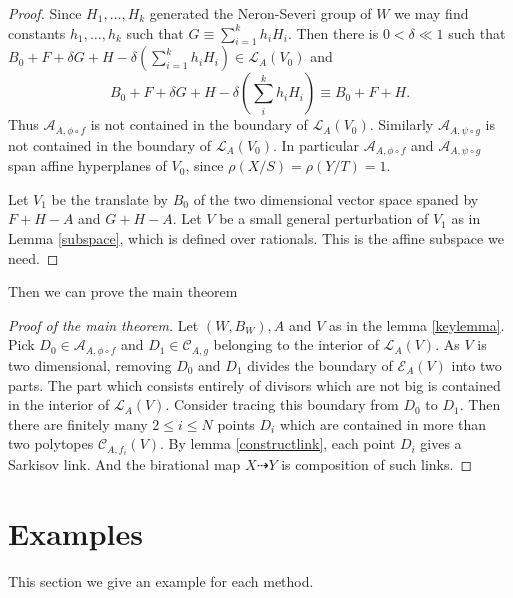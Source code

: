 \documentclass[11pt]{amsart}
\numberwithin{equation}{section}
\begin{document}
\begin{proof}
Since $H_{1},\ldots ,H_{k}$ generated the Neron-Severi group of $W$ we may find constants $h_{1},\ldots ,h_{k}$ such that $G \equiv \sum^{k}_{i=1} h_{i}H_{i}$. Then there is $0< \delta\ll 1$ such that  $B_{0}+F+\delta G+H- \delta(\sum_{i=1}^{k} h_{i}H_{i}) \in \mathcal{L}_{A}(V_{0})$ and
\[
  B_{0}+F+\delta G+H-\delta (\sum_i^k h_{i}H_{i}) \equiv B_{0}+F+H
.\]
Thus $\mathcal{A}_{A,\phi\circ f}$ is not contained in the boundary of $\mathcal{L}_{A}(V_{0})$. Similarly $\mathcal{A}_{A,\psi\circ g}$ is not contained in the boundary of $\mathcal{L}_{A}(V_{0})$. In particular $\mathcal{A}_{A,\phi\circ f}$ and   $\mathcal{A}_{A,\psi\circ g}$ span affine hyperplanes of $V_{0}$, since $\rho(X/S)=\rho(Y/T)=1$.

Let $V_{1}$ be the translate by $B_{0}$ of the two dimensional vector space spaned by $F+H-A$ and $G+H-A$. Let $V$ be a small general perturbation of $V_{1}$ as in Lemma \ref{subspace}, which is defined over rationals. This is the affine subspace we need.
\end{proof}
Then we can prove the main theorem

\begin{proof}[Proof of the main theorem]
Let $(W,B_{W}),A $ and $V$ as in the lemma \ref{keylemma}.  Pick $ D_{0} \in \mathcal{A}_{A,\phi\circ f} $  and $ D_1\in \mathcal{C}_{A,g} $ belonging to the interior of $ \mathcal{L}_A(V) $. As $ V $ is two dimensional, removing $ D_0 $ and $ D_1 $ divides the boundary of $ \mathcal{E}_A(V) $ into two parts. The part which consists entirely of divisors which are not big is contained in the interior of $ \mathcal{L}_A(V) $. Consider tracing this boundary from $ D_0 $ to $ D_1 $. Then there are finitely many $ 2\leqslant i\leqslant N $ points $ D_i $ which are contained in more than two polytopes $ \mathcal{C}_{A,f_i}(V) $. By lemma \ref{constructlink},  each point $ D_i $ gives a Sarkisov link. And the birational map $X \dashrightarrow Y$ is composition of such links.
\end{proof}

\section{Examples}
This  section we give an example for each method.
\end{document}
